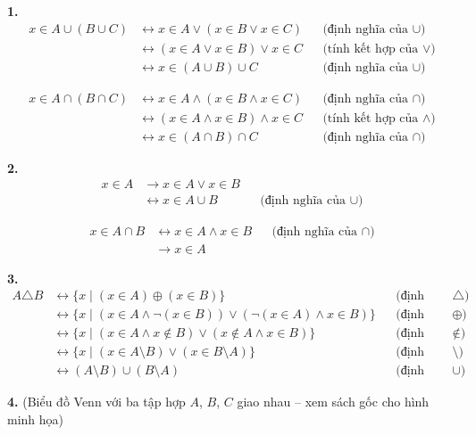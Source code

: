 \documentclass[12pt,a4paper]{article}
\theoremstyle{definition}
\begin{document}
\textbf{1.}
\begin{align*}
x \in A \cup (B \cup C) &\leftrightarrow x \in A \lor (x \in B \lor x \in C) && \text{(định nghĩa của $\cup$)}\\
&\leftrightarrow (x \in A \lor x \in B) \lor x \in C && \text{(tính kết hợp của $\lor$)}\\
&\leftrightarrow x \in (A \cup B) \cup C && \text{(định nghĩa của $\cup$)}
\end{align*}

\begin{align*}
x \in A \cap (B \cap C) &\leftrightarrow x \in A \land (x \in B \land x \in C) && \text{(định nghĩa của $\cap$)}\\
&\leftrightarrow (x \in A \land x \in B) \land x \in C && \text{(tính kết hợp của $\land$)}\\
&\leftrightarrow x \in (A \cap B) \cap C && \text{(định nghĩa của $\cap$)}
\end{align*}

\bigskip
\textbf{2.}
\begin{align*}
x \in A &\to x \in A \lor x \in B \\
&\leftrightarrow x \in A \cup B && \text{(định nghĩa của $\cup$)}
\end{align*}

\begin{align*}
x \in A \cap B &\leftrightarrow x \in A \land x \in B && \text{(định nghĩa của $\cap$)}\\
&\to x \in A
\end{align*}

\bigskip
\textbf{3.}
\begin{align*}
A \triangle B &\leftrightarrow \{x \mid (x \in A) \oplus (x \in B)\} && \text{(định nghĩa của $\triangle$)}\\
&\leftrightarrow \{x \mid (x \in A \land \neg(x \in B)) \lor (\neg(x \in A) \land x \in B)\} && \text{(định nghĩa của $\oplus$)}\\
&\leftrightarrow \{x \mid (x \in A \land x \notin B) \lor (x \notin A \land x \in B)\} && \text{(định nghĩa của $\notin$)}\\
&\leftrightarrow \{x \mid (x \in A \setminus B) \lor (x \in B \setminus A)\} && \text{(định nghĩa của $\setminus$)}\\
&\leftrightarrow (A \setminus B) \cup (B \setminus A) && \text{(định nghĩa của $\cup$)}
\end{align*}

\bigskip
\textbf{4.} (Biểu đồ Venn với ba tập hợp $A$, $B$, $C$ giao nhau -- xem sách gốc cho hình minh họa)
\end{document}
